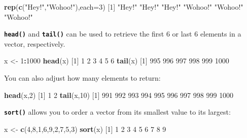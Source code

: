 \documentclass[
]{book}
\newenvironment{Shaded}{\begin{snugshade}}{\end{snugshade}}
\newcommand{\DataTypeTok}[1]{\textcolor[rgb]{0.13,0.29,0.53}{#1}}
\newcommand{\DecValTok}[1]{\textcolor[rgb]{0.00,0.00,0.81}{#1}}
\newcommand{\KeywordTok}[1]{\textcolor[rgb]{0.13,0.29,0.53}{\textbf{#1}}}
\newcommand{\NormalTok}[1]{#1}
\newcommand{\OperatorTok}[1]{\textcolor[rgb]{0.81,0.36,0.00}{\textbf{#1}}}
\newcommand{\StringTok}[1]{\textcolor[rgb]{0.31,0.60,0.02}{#1}}
\begin{document}
\begin{Shaded}
\begin{Highlighting}[]
\KeywordTok{rep}\NormalTok{(}\KeywordTok{c}\NormalTok{(}\StringTok{"Hey!"}\NormalTok{,}\StringTok{"Wohoo!"}\NormalTok{),}\DataTypeTok{each=}\DecValTok{3}\NormalTok{)}
\NormalTok{[}\DecValTok{1}\NormalTok{] }\StringTok{"Hey!"}   \StringTok{"Hey!"}   \StringTok{"Hey!"}   \StringTok{"Wohoo!"} \StringTok{"Wohoo!"} \StringTok{"Wohoo!"}
\end{Highlighting}
\end{Shaded}

\textbf{\texttt{head()}} and \textbf{\texttt{tail()}} can be used to retrieve the first 6 or last 6 elements in a vector, respectively.

\begin{Shaded}
\begin{Highlighting}[]
\NormalTok{x <-}\StringTok{ }\DecValTok{1}\OperatorTok{:}\DecValTok{1000}
\KeywordTok{head}\NormalTok{(x)}
\NormalTok{[}\DecValTok{1}\NormalTok{] }\DecValTok{1} \DecValTok{2} \DecValTok{3} \DecValTok{4} \DecValTok{5} \DecValTok{6}
\KeywordTok{tail}\NormalTok{(x)}
\NormalTok{[}\DecValTok{1}\NormalTok{]  }\DecValTok{995}  \DecValTok{996}  \DecValTok{997}  \DecValTok{998}  \DecValTok{999} \DecValTok{1000}
\end{Highlighting}
\end{Shaded}

You can also adjust how many elements to return:

\begin{Shaded}
\begin{Highlighting}[]
\KeywordTok{head}\NormalTok{(x,}\DecValTok{2}\NormalTok{)}
\NormalTok{[}\DecValTok{1}\NormalTok{] }\DecValTok{1} \DecValTok{2}
\KeywordTok{tail}\NormalTok{(x,}\DecValTok{10}\NormalTok{)}
\NormalTok{ [}\DecValTok{1}\NormalTok{]  }\DecValTok{991}  \DecValTok{992}  \DecValTok{993}  \DecValTok{994}  \DecValTok{995}  \DecValTok{996}  \DecValTok{997}  \DecValTok{998}  \DecValTok{999} \DecValTok{1000}
\end{Highlighting}
\end{Shaded}

\textbf{\texttt{sort()}} allows you to order a vector from its smallest value to its largest:

\begin{Shaded}
\begin{Highlighting}[]
\NormalTok{x <-}\StringTok{ }\KeywordTok{c}\NormalTok{(}\DecValTok{4}\NormalTok{,}\DecValTok{8}\NormalTok{,}\DecValTok{1}\NormalTok{,}\DecValTok{6}\NormalTok{,}\DecValTok{9}\NormalTok{,}\DecValTok{2}\NormalTok{,}\DecValTok{7}\NormalTok{,}\DecValTok{5}\NormalTok{,}\DecValTok{3}\NormalTok{)}
\KeywordTok{sort}\NormalTok{(x)}
\NormalTok{[}\DecValTok{1}\NormalTok{] }\DecValTok{1} \DecValTok{2} \DecValTok{3} \DecValTok{4} \DecValTok{5} \DecValTok{6} \DecValTok{7} \DecValTok{8} \DecValTok{9}
\end{Highlighting}
\end{Shaded}
\end{document}
